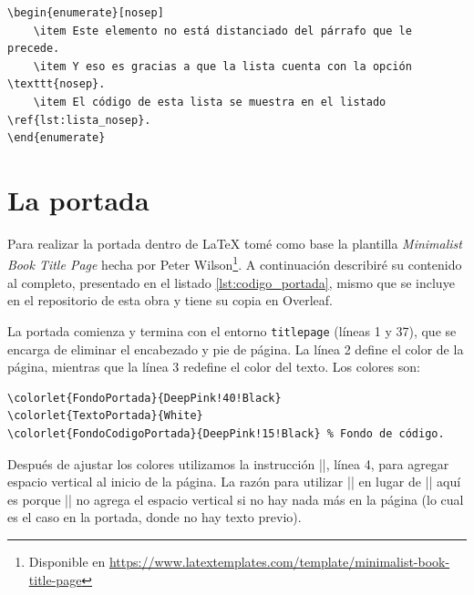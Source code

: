 \begin{lstlisting}[style=latex,label=lst:lista_nosep,caption={Lista enumerada con opción \texttt{nosep}.}]
\begin{enumerate}[nosep]
	\item Este elemento no está distanciado del párrafo que le precede.
	\item Y eso es gracias a que la lista cuenta con la opción \texttt{nosep}.
	\item El código de esta lista se muestra en el listado \ref{lst:lista_nosep}.
\end{enumerate}
\end{lstlisting}



\section{La portada}
\label{sec:la_portada}



Para realizar la portada dentro de \LaTeX{} tomé como base la plantilla \emph{Minimalist Book Title Page} hecha por Peter Wilson\footnote{Disponible en \href{https://www.latextemplates.com/template/minimalist-book-title-page}{https://www.latextemplates.com/template/minimalist-book-title-page}}. A continuación describiré su contenido al completo, presentado en el listado \ref{lst:codigo_portada}, mismo que se incluye en el repositorio de esta obra y tiene su copia en Overleaf.



La portada comienza y termina con el entorno \texttt{titlepage} (líneas 1 y 37), que se encarga de eliminar el encabezado y pie de página. La línea 2 define el color de la página, mientras que la línea 3 redefine el color del texto. Los colores son:

\begin{lstlisting}[style=latex]
\colorlet{FondoPortada}{DeepPink!40!Black}
\colorlet{TextoPortada}{White}
\colorlet{FondoCodigoPortada}{DeepPink!15!Black} % Fondo de código.
\end{lstlisting}

Después de ajustar los colores utilizamos la instrucción |\vspace*|, línea 4, para agregar espacio vertical al inicio de la página. La razón para utilizar |\vspace*| en lugar de |\vspace| aquí es porque |\vspace| no agrega el espacio vertical si no hay nada más en la página (lo cual es el caso en la portada, donde no hay texto previo).


